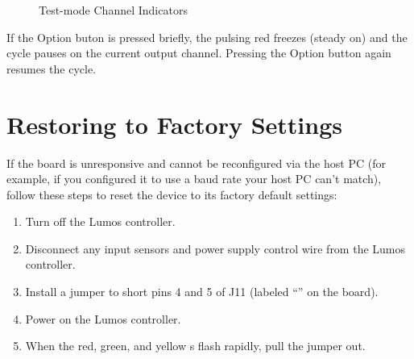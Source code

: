 \documentclass[letterpaper,twoside,onecolumn,openright,final]{memoir}
\begin{document}
\begin{figure}
\begin{center}
  \end{center}
  \caption{Test-mode Channel Indicators\label{fig:testbin}}
\end{figure}

If the Option buton is pressed briefly, the pulsing red  freezes (steady on) and the cycle
pauses on the current output channel.  Pressing the Option button again resumes the cycle.
      
\section{Restoring to Factory Settings}
If the board is unresponsive and cannot be reconfigured via the host PC (for example, if you configured
it to use a baud rate your host PC can't match), follow these steps to reset the device to its 
factory default settings:
\begin{enumerate}
	\item	Turn off the Lumos controller.
	\item	Disconnect any input sensors and power supply control wire from the Lumos
		controller.
	\item	Install a jumper to short pins 4 and 5 of J11 (labeled ``''
		on the board).
	\item	Power on the Lumos controller.
	\item	When the red, green, and yellow s flash rapidly, pull the
		jumper out.
\end{enumerate}
\end{document}
